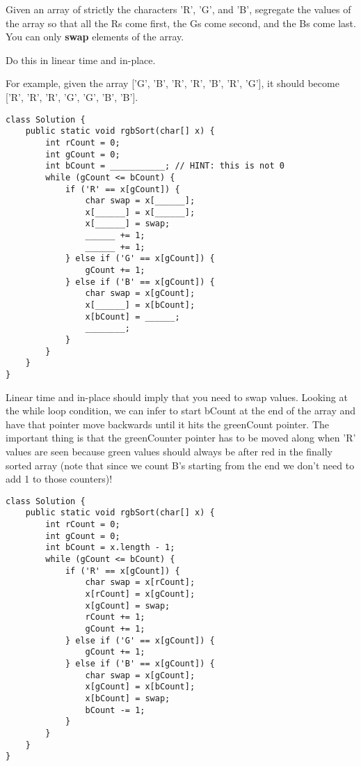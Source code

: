 \begin{blocksection}
\question Given an array of strictly the characters 'R', 'G', and 'B', segregate the values of the array so that all the Rs come first, the Gs come second, and the Bs come last. You can only \textbf{swap} elements of the array.

Do this in linear time and in-place.

For example, given the array ['G', 'B', 'R', 'R', 'B', 'R', 'G'], it should become ['R', 'R', 'R', 'G', 'G', 'B', 'B'].

\begin{lstlisting}
class Solution {
    public static void rgbSort(char[] x) {
        int rCount = 0;
        int gCount = 0;
        int bCount = ___________; // HINT: this is not 0
        while (gCount <= bCount) {
            if ('R' == x[gCount]) {
                char swap = x[______];
                x[______] = x[______];
                x[______] = swap;
                ______ += 1;
                ______ += 1;
            } else if ('G' == x[gCount]) {
                gCount += 1;
            } else if ('B' == x[gCount]) {
                char swap = x[gCount];
                x[______] = x[bCount];
                x[bCount] = ______;
                ________;
            }
        }
    }
}
\end{lstlisting}

\begin{solution}[1in]

Linear time and in-place should imply that you need to swap values. Looking at the while loop condition, we can infer to start bCount at the end of the array and have that pointer move backwards until it hits the greenCount pointer. The important thing is that the greenCounter pointer has to be moved along when 'R' values are seen because green values should always be after red in the finally sorted array (note that since we count B's starting from the end we don't need to add 1 to those counters)!

\begin{lstlisting}
class Solution {
    public static void rgbSort(char[] x) {
        int rCount = 0;
        int gCount = 0;
        int bCount = x.length - 1;
        while (gCount <= bCount) {
            if ('R' == x[gCount]) {
                char swap = x[rCount];
                x[rCount] = x[gCount];
                x[gCount] = swap;
                rCount += 1;
                gCount += 1;
            } else if ('G' == x[gCount]) {
                gCount += 1;
            } else if ('B' == x[gCount]) {
                char swap = x[gCount];
                x[gCount] = x[bCount];
                x[bCount] = swap;
                bCount -= 1;
            }
        }
    }
}
\end{lstlisting}
\end{solution}
\end{blocksection}
